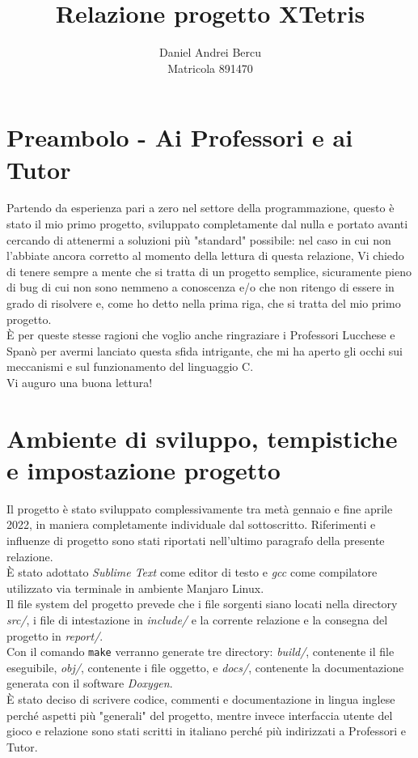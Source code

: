 \documentclass[a4paper]{article}
\title{Relazione progetto XTetris}
\author{Daniel Andrei Bercu \\Matricola 891470}
\date{}
\begin{document}
\maketitle

\section{Preambolo - Ai Professori e ai Tutor}
Partendo da esperienza pari a zero nel settore della programmazione, questo è stato il mio primo progetto, sviluppato completamente dal nulla e portato avanti cercando di attenermi a soluzioni più "standard" possibile: nel caso in cui non l'abbiate ancora corretto al momento della lettura di questa relazione, Vi chiedo di tenere sempre a mente che si tratta di un progetto semplice, sicuramente pieno di bug di cui non sono nemmeno a conoscenza e/o che non ritengo di essere in grado di risolvere e, come ho detto nella prima riga, che si tratta del mio primo progetto.\\
È per queste stesse ragioni che voglio anche ringraziare i Professori Lucchese e Spanò per avermi lanciato questa sfida intrigante, che mi ha aperto gli occhi sui meccanismi e sul funzionamento del linguaggio C.\\
Vi auguro una buona lettura!

\section{Ambiente di sviluppo, tempistiche e impostazione progetto}
Il progetto è stato sviluppato complessivamente tra metà gennaio e fine aprile 2022, in maniera completamente individuale dal sottoscritto. Riferimenti e influenze di progetto sono stati riportati nell'ultimo paragrafo della presente relazione.\\
È stato adottato \textit{Sublime Text} come editor di testo e \textit{gcc} come compilatore utilizzato via terminale in ambiente Manjaro Linux.\\
Il file system del progetto prevede che i file sorgenti siano locati nella directory \textit{src/}, i file di intestazione in \textit{include/} e la corrente relazione e la consegna del progetto in \textit{report/}.\\
Con il comando \texttt{make} verranno generate tre directory: \textit{build/}, contenente il file eseguibile, \textit{obj/}, contenente i file oggetto, e \textit{docs/}, contenente la documentazione generata con il software \textit{Doxygen}.\\
È stato deciso di scrivere codice, commenti e documentazione in lingua inglese perché aspetti più "generali" del progetto, mentre invece interfaccia utente del gioco e relazione sono stati scritti in italiano perché più indirizzati a Professori e Tutor.
\end{document}
